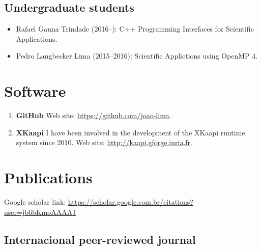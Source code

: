 \documentclass[11pt,a4paper]{article}
\begin{document}
\subsection{Undergraduate students}
\begin{itemize} \itemsep -2pt
\item Rafael Gauna Trindade (2016--): C++ Programming Interfaces for
  Scientific Applications.
\item Pedro Langbecker Lima (2015--2016): Scientific Applictions using
  OpenMP 4.
\end{itemize}

\section{Software}

\begin{enumerate}
\item {\bf GitHub} Web site: \url{https://github.com/joao-lima}.
\item {\bf XKaapi} I have been involved in the development of 
the XKaapi runtime system since 2010. Web site: \url{http://kaapi.gforge.inria.fr}.
\end{enumerate}

\section{Publications}

Google scholar link: {\small \url{https://scholar.google.com.br/citations?user=jb6bKmoAAAAJ}}

\subsection{Internacional peer-reviewed journal}
\end{document}
